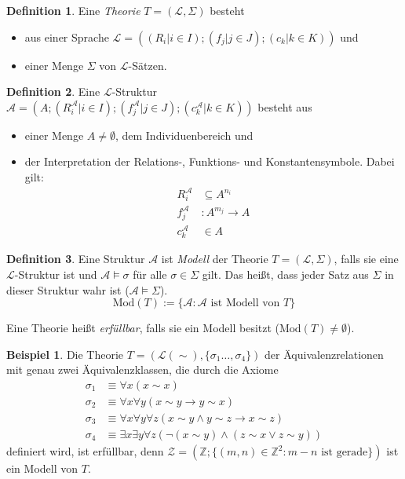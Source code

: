 \documentclass[german,headsepline,fleqn,parskip=half]{scrartcl}
\theoremstyle{definition}
\newtheorem*{dfn}{Definition}
\newtheorem*{ex}{Beispiel}
\theoremstyle{plain}
\newcommand{\lng}{\mathcal{L}}
\newcommand{\modA}{\mathcal{A}}
\newcommand{\Mod}{\text{Mod}}
\begin{document}
	\begin{dfn}
		Eine \emph{Theorie} $T=(\lng,\Sigma)$ besteht
		\begin{itemize}
			\item aus einer Sprache $\lng=((R_i\vert i\in I);(f_j\vert j\in J);(c_k\vert k\in K))$ und
			\item einer Menge $\Sigma$ von $\lng$-Sätzen.
		\end{itemize}
	\end{dfn}
	
	\begin{dfn}
		Eine $\lng$-Struktur $\modA=(A;(R_i^\modA\vert i\in I);(f_j^\modA\vert j\in J);(c_k^\modA\vert k\in K))$ besteht aus
		\begin{itemize}
			\item einer Menge $A\neq\emptyset$, dem Individuenbereich und
			\item der Interpretation der Relations-, Funktions- und Konstantensymbole. Dabei gilt:
				\begin{align*}
					R_i^\modA&\subseteq A^{n_i} \\
					f_j^\modA&:A^{m_j}\to A \\
					c_k^\modA&\in A
				\end{align*}
		\end{itemize}
	\end{dfn}

	\begin{dfn}
		Eine Struktur $\modA$ ist \emph{Modell} der Theorie $T=(\lng,\Sigma)$,
		falls sie eine $\lng$-Struktur ist und
		$\modA\models\sigma$ für alle $\sigma\in\Sigma$ gilt.
		Das heißt, dass jeder Satz aus $\Sigma$ in dieser Struktur wahr ist ($\modA\models\Sigma$).
		\[\Mod(T):=\{\modA\colon\modA\text{ ist Modell von }T\}\]
		
		Eine Theorie heißt \emph{erfüllbar},
    falls sie ein Modell besitzt ($\Mod(T)\neq\emptyset$).
	\end{dfn}
	
	\begin{ex}
		Die Theorie $T=(\lng(\sim),\{\sigma_1\dots,\sigma_4\})$ der Äquivalenzrelationen mit genau zwei Äquivalenzklassen,
		die durch die Axiome
		\begin{align*}
			\sigma_1&\equiv\forall x(x\sim x) \\
			\sigma_2&\equiv\forall x\forall y(x\sim y\rightarrow y\sim x) \\
			\sigma_3&\equiv\forall x\forall y\forall z(x\sim y\land y\sim z\rightarrow x\sim z) \\
			\sigma_4&\equiv\exists x\exists y\forall z(\lnot(x\sim y)\land(z\sim x\lor z\sim y))
		\end{align*}
		definiert wird, ist erfüllbar,
		denn $\mathcal{Z}=(\mathbb{Z};\{(m,n)\in\mathbb{Z}^2\colon m-n\text{ ist gerade}\})$ ist ein Modell von $T$.
	\end{ex}
\end{document}
